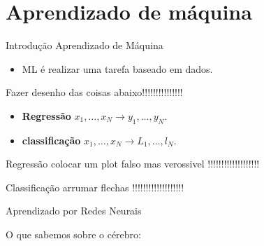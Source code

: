 \documentclass[10pt]{beamer}
\begin{document}
\nocite{DeepLearningbook}
\maketitle

\section{Aprendizado de máquina}

\begin{frame}{Introdução Aprendizado de Máquina}

\begin{itemize}
\item ML é realizar uma tarefa baseado em dados.
\end{itemize}

Fazer desenho das coisas abaixo!!!!!!!!!!!!!!!

\begin{itemize}
\item \textbf{Regressão} $x_1, \dots, x_N \rightarrow y_1, \dots, y_N$.

\item \textbf{classificação} $x_1, \dots, x_N \rightarrow L_1, \dots, l_N$.
\end{itemize}
\end{frame}

\begin{frame}{Regressão}
colocar um plot falso mas verossivel !!!!!!!!!!!!!!!!!!!
\end{frame}


\begin{frame}{Classificação}
arrumar flechas !!!!!!!!!!!!!!!!!!!

\end{frame}


\begin{frame}{Aprendizado por Redes Neurais}

O que sabemos sobre o cérebro:
\begin{itemize}

\end{itemize}
\end{frame}
\end{document}
